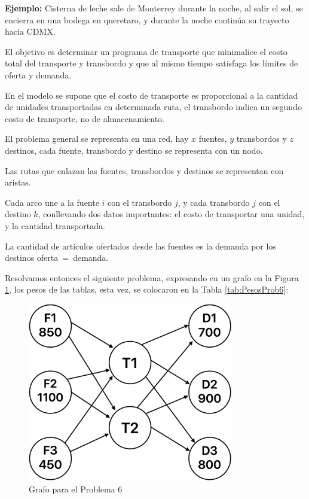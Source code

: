 \documentclass[12pt]{article}  %
\begin{document}
\textbf{Ejemplo:} Cisterna de leche sale de Monterrey durante la noche, al salir el sol, se encierra en una bodega en queretaro, y durante la noche continúa su trayecto hacia CDMX.

El objetivo es determinar un programa de transporte que minimalice el costo total del transporte y transbordo y que al mismo tiempo satisfaga los límites de oferta y demanda.

En el modelo se supone que el costo de transporte es proporcional a la cantidad de unidades transportadas en determinada ruta, el transbordo indica un segundo costo de transporte, no de almacenamiento.

El problema general se representa en una red, hay $x$ fuentes, $y$ transbordos y $z$ destinos, cada fuente, transbordo y destino se representa con un nodo.

Las rutas que enlazan las fuentes, transbordos y destinos se representan con aristas.

Cada arco une a la fuente $i$ con el transbordo $j$, y cada transbordo $j$ con el destino $k$, conllevando dos datos importantes: el costo de transportar una unidad, y la cantidad transportada.

La cantidad de artículos ofertados desde las fuentes es la demanda por los destinos \mbox{oferta = demanda}.

Resolvamos entonces el siguiente problema, expresando en un grafo en la Figura \ref{fig:grafProb6}, los pesos de las tablas, esta vez, se colocaron en la Tabla \ref{tab:PesosProb6}:

\begin{figure}[h]
    \centering
    \caption{Grafo para el Problema 6}
    \label{fig:grafProb6}
    \includegraphics[width=0.8\textwidth]{grafoProb6.png}
\end{figure}
\end{document}
